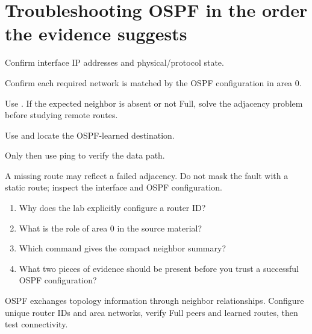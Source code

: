 \section{Troubleshooting OSPF in the order the evidence suggests}
\begin{netsteps}
\item Confirm interface IP addresses and physical/protocol state.
\item Confirm each required network is matched by the OSPF configuration in area 0.
\item Use . If the expected neighbor is absent or not Full, solve the adjacency problem before studying remote routes.
\item Use  and locate the OSPF-learned destination.
\item Only then use ping to verify the data path.
\end{netsteps}

\begin{pitfall}
A missing route may reflect a failed adjacency. Do not mask the fault with a static route; inspect the interface and OSPF configuration.
\end{pitfall}

\begin{quickcheck}
\begin{enumerate}
\item Why does the lab explicitly configure a router ID?
\item What is the role of area 0 in the source material?
\item Which command gives the compact neighbor summary?
\item What two pieces of evidence should be present before you trust a successful OSPF configuration?
\end{enumerate}
\end{quickcheck}

\begin{chapterrecap}
OSPF exchanges topology information through neighbor relationships. Configure unique router IDs and area networks, verify Full peers and learned routes, then test connectivity.
\end{chapterrecap}


